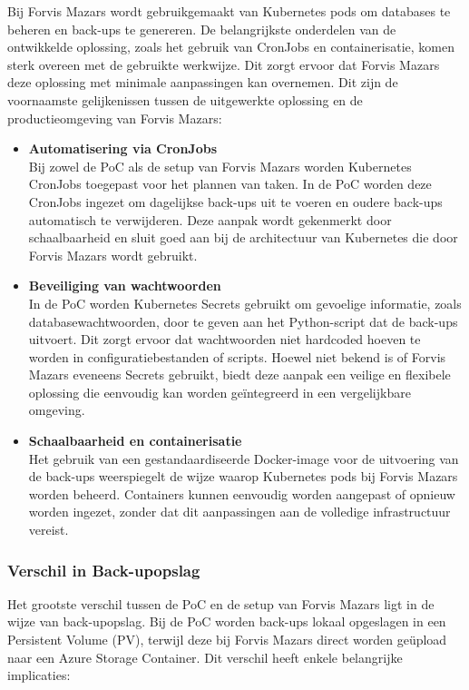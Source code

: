 Bij Forvis Mazars wordt gebruikgemaakt van Kubernetes pods om databases te beheren en back-ups te genereren. De belangrijkste onderdelen van de ontwikkelde oplossing, zoals het gebruik van CronJobs en containerisatie, komen sterk overeen met de gebruikte werkwijze. Dit zorgt ervoor dat Forvis Mazars deze oplossing met minimale aanpassingen kan overnemen. Dit zijn de voornaamste gelijkenissen tussen de uitgewerkte oplossing en de productieomgeving van Forvis Mazars:

\begin{itemize}
    \item \textbf{Automatisering via CronJobs} \\
    Bij zowel de PoC als de setup van Forvis Mazars worden Kubernetes CronJobs toegepast voor het plannen van taken. In de PoC worden deze CronJobs ingezet om dagelijkse back-ups uit te voeren en oudere back-ups automatisch te verwijderen. Deze aanpak wordt gekenmerkt door schaalbaarheid en sluit goed aan bij de architectuur van Kubernetes die door Forvis Mazars wordt gebruikt.
    
    \item \textbf{Beveiliging van wachtwoorden} \\
    In de PoC worden Kubernetes Secrets gebruikt om gevoelige informatie, zoals databasewachtwoorden, door te geven aan het Python-script dat de back-ups uitvoert. Dit zorgt ervoor dat wachtwoorden niet hardcoded hoeven te worden in configuratiebestanden of scripts. Hoewel niet bekend is of Forvis Mazars eveneens Secrets gebruikt, biedt deze aanpak een veilige en flexibele oplossing die eenvoudig kan worden geïntegreerd in een vergelijkbare omgeving.
    
    \item \textbf{Schaalbaarheid en containerisatie} \\
    Het gebruik van een gestandaardiseerde Docker-image voor de uitvoering van de back-ups weerspiegelt de wijze waarop Kubernetes pods bij Forvis Mazars worden beheerd. Containers kunnen eenvoudig worden aangepast of opnieuw worden ingezet, zonder dat dit aanpassingen aan de volledige infrastructuur vereist.
\end{itemize}


\subsubsection*{Verschil in Back-upopslag}

Het grootste verschil tussen de PoC en de setup van Forvis Mazars ligt in de wijze van back-upopslag. Bij de PoC worden back-ups lokaal opgeslagen in een Persistent Volume (PV), terwijl deze bij Forvis Mazars direct worden geüpload naar een Azure Storage Container. Dit verschil heeft enkele belangrijke implicaties:

